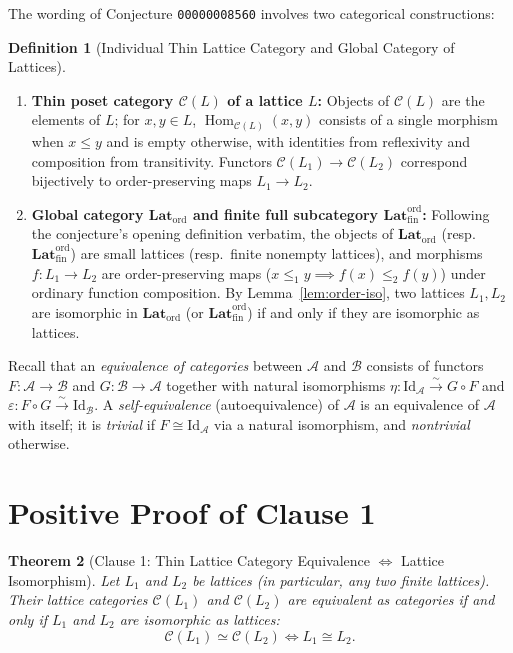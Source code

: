 \documentclass[11pt]{article}
\newtheorem{theorem}{Theorem}[section]
\theoremstyle{definition}
\newtheorem{definition}[theorem]{Definition}
\newcommand{\CatC}{\mathcal{C}}
\newcommand{\LatOrd}{\mathbf{Lat}_{\mathrm{ord}}}
\newcommand{\FinLatOrd}{\mathbf{Lat}_{\mathrm{fin}}^{\mathrm{ord}}}
\newcommand{\Id}{\mathrm{Id}}
\newcommand{\Hom}{\operatorname{Hom}}
\begin{document}
The wording of Conjecture \texttt{00000008560} involves two categorical constructions:

\begin{definition}[Individual Thin Lattice Category and Global Category of Lattices]
\label{def:cats}
\leavevmode
\begin{enumerate}
  \item \textbf{Thin poset category $\CatC(L)$ of a lattice $L$:} Objects of
  $\CatC(L)$ are the elements of $L$; for $x, y \in L$, $\Hom_{\CatC(L)}(x, y)$
  consists of a single morphism when $x \le y$ and is empty otherwise, with
  identities from reflexivity and composition from transitivity. Functors
  $\CatC(L_1) \to \CatC(L_2)$ correspond bijectively to order-preserving maps
  $L_1 \to L_2$.
  \item \textbf{Global category $\LatOrd$ and finite full subcategory
  $\FinLatOrd$:} Following the conjecture's opening definition verbatim, the
  objects of $\LatOrd$ (resp.\ $\FinLatOrd$) are small lattices (resp.\ finite
  nonempty lattices), and morphisms $f : L_1 \to L_2$ are order-preserving maps
  ($x \le_1 y \implies f(x) \le_2 f(y)$) under ordinary function composition.
  By Lemma~\ref{lem:order-iso}, two lattices $L_1, L_2$ are isomorphic in
  $\LatOrd$ (or $\FinLatOrd$) if and only if they are isomorphic as lattices.
\end{enumerate}
\end{definition}

Recall that an \emph{equivalence of categories} between $\mathcal{A}$ and
$\mathcal{B}$ consists of functors $F : \mathcal{A} \to \mathcal{B}$ and
$G : \mathcal{B} \to \mathcal{A}$ together with natural isomorphisms
$\eta : \Id_{\mathcal{A}} \xrightarrow{\sim} G \circ F$ and
$\varepsilon : F \circ G \xrightarrow{\sim} \Id_{\mathcal{B}}$. A
\emph{self-equivalence} (autoequivalence) of $\mathcal{A}$ is an equivalence of
$\mathcal{A}$ with itself; it is \emph{trivial} if $F \cong \Id_{\mathcal{A}}$
via a natural isomorphism, and \emph{nontrivial} otherwise.

\section{Positive Proof of Clause 1}

\begin{theorem}[Clause 1: Thin Lattice Category Equivalence $\iff$ Lattice Isomorphism]
\label{thm:clause1}
Let $L_1$ and $L_2$ be lattices (in particular, any two finite lattices). Their
lattice categories $\CatC(L_1)$ and $\CatC(L_2)$ are equivalent as categories if
and only if $L_1$ and $L_2$ are isomorphic as lattices:
\[
  \CatC(L_1) \simeq \CatC(L_2) \iff L_1 \cong L_2.
\]
\end{theorem}
\end{document}
